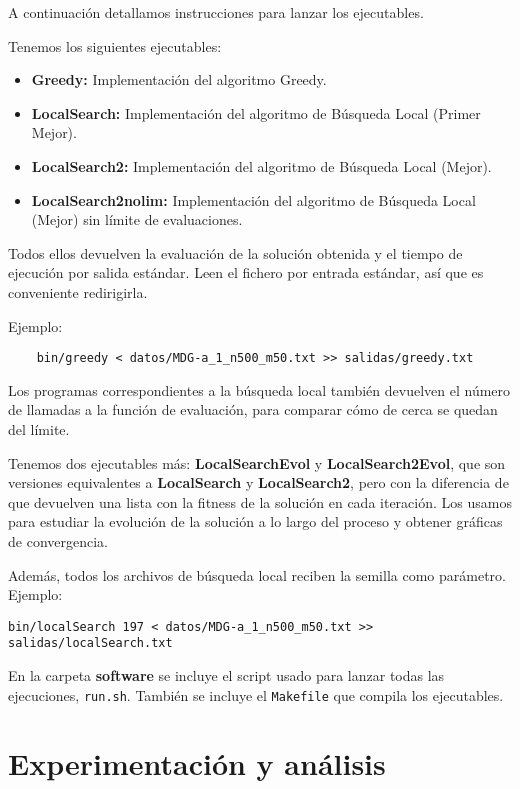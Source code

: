 \documentclass{article}
\begin{document}
A continuación detallamos instrucciones para lanzar los ejecutables.

Tenemos los siguientes ejecutables:

\begin{itemize}
	\item \textbf{Greedy:} Implementación del algoritmo Greedy.
	\item \textbf{LocalSearch:} Implementación del algoritmo de Búsqueda Local (Primer Mejor).
	\item \textbf{LocalSearch2:} Implementación del algoritmo de Búsqueda Local (Mejor).
	\item \textbf{LocalSearch2nolim:} Implementación del algoritmo de Búsqueda Local (Mejor) sin límite de evaluaciones.
\end{itemize}

Todos ellos devuelven la evaluación de la solución obtenida y el tiempo de ejecución por salida estándar.
Leen el fichero por entrada estándar, así que es conveniente redirigirla.

Ejemplo:
\begin{verbatim}
	bin/greedy < datos/MDG-a_1_n500_m50.txt >> salidas/greedy.txt
\end{verbatim}

Los programas correspondientes a la búsqueda local también devuelven el número de llamadas a la función de evaluación, para
comparar cómo de cerca se quedan del límite.

Tenemos dos ejecutables más: \textbf{LocalSearchEvol} y \textbf{LocalSearch2Evol}, que son versiones equivalentes a
\textbf{LocalSearch} y \textbf{LocalSearch2}, pero con la diferencia de que devuelven una lista con la fitness de la solución
en cada iteración. Los usamos para estudiar la evolución de la solución a lo largo del proceso y obtener gráficas de convergencia.

Además, todos los archivos de búsqueda local reciben la semilla como parámetro. Ejemplo:
\begin{verbatim}
bin/localSearch 197 < datos/MDG-a_1_n500_m50.txt >> salidas/localSearch.txt
\end{verbatim}

En la carpeta \textbf{software} se incluye el script usado para lanzar todas las ejecuciones, \texttt{run.sh}. También se incluye
el \texttt{Makefile} que compila los ejecutables.

\pagebreak

\section{Experimentación y análisis}
\end{document}
